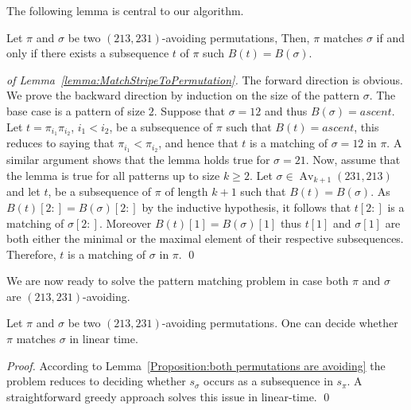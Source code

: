 \documentclass[a4paper]{llncs}
\DeclareMathOperator{\Avd}{Av}
\newcommand\Av[2]{\Avd_{{#1}}({#2})}
\newcommand{\bijection}{B}
\begin{document}
The following lemma is central to our algorithm.

\begin{lemma}
\label{lemma:MatchStripeToPermutation}
Let $\pi$ and $\sigma$ be two $(213,231)$-avoiding permutations,
Then, $\pi$ matches $\sigma$ if and only if 
there exists a subsequence $t$ of $\pi$ such $\bijection(t)=\bijection(\sigma)$.
\end{lemma}

\begin{proof}[of Lemma~\ref{lemma:MatchStripeToPermutation}]
The forward direction is obvious.
We prove the backward direction by induction on the size of the pattern
$\sigma$.
The base case is a pattern of size $2$.
Suppose that $\sigma = 12$ and thus $\bijection(\sigma) = ascent$.
Let $t = \pi_{i_1}\pi_{i_2}$, $i_1 < i_2$, be a subsequence of $\pi$
such that $\bijection(t) = ascent$, this reduces to saying that
$\pi_{i_1} < \pi_{i_2}$, 
and hence that $t$ is a matching of $\sigma = 12$ in $\pi$.
A similar argument shows that the lemma holds true for $\sigma = 21$.
Now, assume that the lemma is true for all patterns up to size $k \geq 2$.
Let $\sigma \in \Av{k+1}{231,213}$ and
let $t$,
be a subsequence of $\pi$ of length $k+1$ such that
$\bijection(t) = \bijection(\sigma)$.
As $\bijection(t)[2:] = \bijection(\sigma)[2:]$
by the inductive hypothesis, it follows that
$t[2:]$ is a matching of $\sigma[2:]$.
Moreover $\bijection(t)[1] = \bijection(\sigma)[1]$ 
thus $t[1]$ and $\sigma[1]$ are both either the minimal or the maximal
element of their respective subsequences.
Therefore, $t$ is a matching of $\sigma$ in $\pi$.
\qed
\end{proof}

We are now ready to solve the pattern matching problem in case
both $\pi$ and $\sigma$ are $(213, 231)$-avoiding.

\begin{proposition}
	\label{Proposition:both permutations are avoiding}
	Let $\pi$ and $\sigma$ be two $(213,231)$-avoiding permutations.
	One can decide whether $\pi$ matches $\sigma$ in linear time.
\end{proposition}

\begin{proof}
According to Lemma~\ref{Proposition:both permutations are avoiding} the problem reduces
to deciding whether $s_\sigma$ occurs as a subsequence in $s_\pi$.
A straightforward greedy approach solves this issue in linear-time.
\qed
\end{proof}
\end{document}
